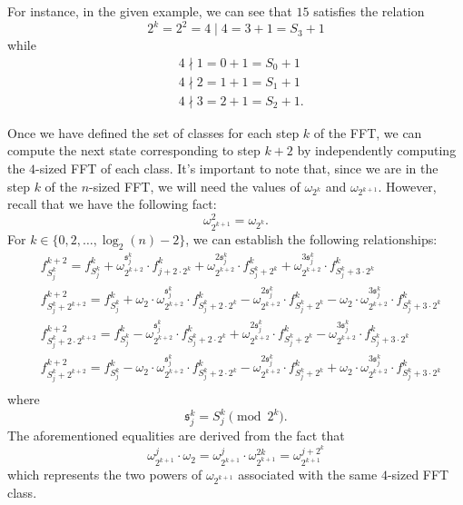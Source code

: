 For instance, in the given example, we can see that $15$ satisfies the relation
\[
2^k = 2^2 = 4 \mid 4 = 3 + 1 = S_{3} + 1
\]
while
\begin{align*}
& 4 \nmid 1 = 0 + 1 = S_{0} + 1 \\
& 4 \nmid 2 = 1 + 1 = S_{1} + 1 \\
& 4 \nmid 3 = 2 + 1 = S_{2} + 1.
\end{align*}

Once we have defined the set of classes for each step $k$ of the FFT, we can compute the next state corresponding to step $k + 2$ by independently computing the $4$-sized FFT of each class. It's important to note that, since we are in the step $k$ of the $n$-sized FFT, we will need the values of $\omega_{2^k}$ and $\omega_{2^{k+1}}$. However, recall that we have the following fact:
\[
\omega_{2^{k+1}}^2 = \omega_{2^{k}}.
\]
For $k \in \{ 0, 2, \dots, \log_2(n) - 2 \}$, we can establish the following relationships:
\begin{align*}
& f_{S_j^k}^{k+2} = f_{S_j^k}^k + \omega_{2^{k+2}}^{\mathfrak{s}_j^k} \cdot f_{j + 2 \cdot 2^k}^k + \omega_{2^{k+2}}^{2{\mathfrak{s}_j^k}} \cdot f_{S_j^k + 2^k}^k + \omega_{2^{k+2}}^{3{\mathfrak{s}_j^k}} \cdot f_{S_j^k + 3 \cdot 2^k}^k \\
& f_{S_j^k + 2^{k+2}}^{k+2} = f_{S_j^k}^k + \omega_2 \cdot \omega_{2^{k+2}}^{\mathfrak{s}_j^k} \cdot f_{S_j^k + 2 \cdot 2^k}^k - \omega_{2^{k+2}}^{2{\mathfrak{s}_j^k}} \cdot f_{S_j^k + 2^k}^k  - \omega_2 \cdot \omega_{2^{k+2}}^{3{\mathfrak{s}_j^k}} \cdot f_{S_j^k + 3 \cdot 2^k}^k \\
& f_{S_j^k + 2 \cdot 2^{k+2}}^{k+2} = f_{S_j^k}^k - \omega_{2^{k+2}}^{\mathfrak{s}_j^k} \cdot f_{S_j^k + 2 \cdot 2^k}^k + \omega_{2^{k+2}}^{2{\mathfrak{s}_j^k}} \cdot f_{S_j^k + 2^k}^k - \omega_{2^{k+2}}^{3{\mathfrak{s}_j^k}} \cdot f_{S_j^k + 3 \cdot 2^k}^k \\
& f_{S_j^k + 2^{k+2}}^{k+2} = f_{S_j^k}^k - \omega_2 \cdot \omega_{2^{k+2}}^{\mathfrak{s}_j^k} \cdot f_{S_j^k + 2 \cdot 2^k}^k - \omega_{2^{k+2}}^{2{\mathfrak{s}_j^k}} \cdot f_{S_j^k + 2^k}^k + \omega_2 \cdot \omega_{2^{k+2}}^{3{\mathfrak{s}_j^k}} \cdot f_{S_j^k + 3 \cdot 2^k}^k \\
\end{align*}
where 
\[
\mathfrak{s}_j^k = S_j^k \pmod{2^{k}}.
\]
The aforementioned equalities are derived from the fact that
\[
\omega^{j}_{2^{k+1}} \cdot \omega_2 = \omega^j_{2^{k+1}} \cdot \omega_{2^{k+1}}^{2k} =  \omega_{2^{k+1}}^{j + 2^k}
\]
which represents the two powers of $\omega_{2^{k+1}}$ associated with the same $4$-sized FFT class.

